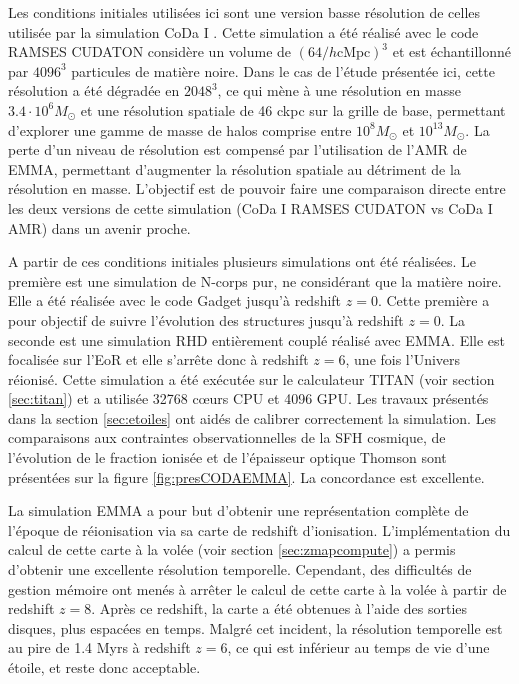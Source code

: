 Les conditions initiales utilisées ici sont une version basse résolution de celles utilisée par la simulation \ac{CoDa} I \citep{ocvirk_cosmic_2015}.
Cette simulation a été réalisé avec le code RAMSES CUDATON %
considère un volume de $\left( 64/h \mathrm{cMpc} \right)^3$ et est échantillonné par $4096^3$ particules de matière noire.
Dans le cas de l'étude présentée ici, cette résolution a été dégradée en $2048^3$, ce qui mène à une résolution en masse $3.4 \cdot 10^6 M_\odot$ et une résolution spatiale de 46 ckpc sur la grille de base, permettant d'explorer une gamme de masse de halos comprise entre $10^8 M_\odot$ et $10^{13}M_\odot$.
La perte d'un niveau de résolution est compensé par l'utilisation de l'\ac{AMR} de EMMA, permettant d’augmenter la résolution spatiale au détriment de la résolution en masse.
L'objectif est de pouvoir faire une comparaison directe entre les deux versions de cette simulation (CoDa I RAMSES CUDATON vs CoDa I AMR) dans un avenir proche.


A partir de ces conditions initiales plusieurs simulations ont été réalisées.
Le première est une simulation de N-corps pur, ne considérant que la matière noire.
Elle a été réalisée avec le code Gadget \citep{springel_cosmological_2005} jusqu'à redshift $z=0$.
Cette première a pour objectif de suivre l'évolution des structures jusqu'à redshift $z=0$.
La seconde est une simulation \ac{RHD} entièrement couplé réalisé avec EMMA.
Elle est focalisée sur l'\ac{EoR} et elle s’arrête donc à redshift $z=6$, une fois l'Univers réionisé.
Cette simulation a été exécutée sur le calculateur TITAN (voir section \ref{sec:titan}) et a utilisée 32768 cœurs \ac{CPU} et 4096 \ac{GPU}.
Les travaux présentés dans la section \ref{sec:etoiles} ont aidés de calibrer correctement la simulation.
Les comparaisons aux contraintes observationnelles de la \ac{SFH} cosmique, de l'évolution de le fraction ionisée et de l'épaisseur optique Thomson sont présentées sur la figure \ref{fig:presCODAEMMA}. 
La concordance est excellente.

La simulation EMMA a pour but d'obtenir une représentation complète de l'époque de réionisation via sa carte de redshift d'ionisation.
L'implémentation du calcul de cette carte à la volée (voir section \ref{sec:zmapcompute}) a permis d'obtenir une excellente résolution temporelle.
Cependant, des difficultés de gestion mémoire ont menés à arrêter le calcul de cette carte à la volée à partir de redshift $z=8$.
Après ce redshift, la carte a été obtenues à l'aide des sorties disques, plus espacées en temps.
Malgré cet incident, la résolution temporelle est au pire de 1.4 Myrs à redshift $z=6$, ce qui est inférieur au temps de vie d'une étoile, et reste donc acceptable.

